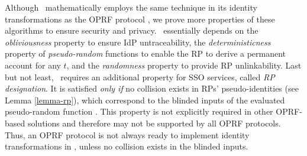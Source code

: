 Although \usso\ mathematically employs the same technique in its identity transformations as the OPRF protocol \cite{oprf-proved,voprf-proved}, we prove more properties of these algorithms to ensure security and privacy. %
\usso\ essentially depends on the \emph{obliviousness} property to ensure IdP untraceability, %
the \emph{deterministicness} property of \emph{pseudo-random} functions to enable the RP to derive a permanent account for any $t$, and the \emph{randomness} property to provide RP unlinkability. %
Last but not least, \usso\ requires an additional property for SSO services, called \emph{RP designation}.
It is satisfied \emph{only if} no collision exists in RPs' pseudo-identities (see Lemma \ref{lemma-rp}), which correspond to the blinded inputs of the evaluated pseudo-random function \cite{oprf-proved,voprf-proved}.
This property %
is not explicitly required in other OPRF-based solutions and therefore may not be supported by all OPRF protocols. Thus, an OPRF protocol is not always ready to implement identity transformations in \usso, unless no collision exists in the blinded inputs.

